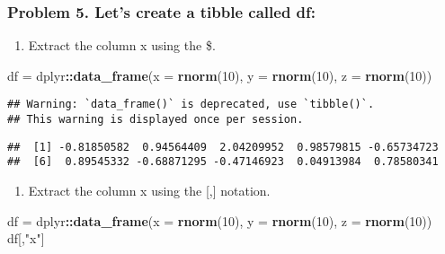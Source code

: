 \documentclass[]{article}
\newenvironment{Shaded}{\begin{snugshade}}{\end{snugshade}}
\newcommand{\DataTypeTok}[1]{\textcolor[rgb]{0.13,0.29,0.53}{#1}}
\newcommand{\DecValTok}[1]{\textcolor[rgb]{0.00,0.00,0.81}{#1}}
\newcommand{\KeywordTok}[1]{\textcolor[rgb]{0.13,0.29,0.53}{\textbf{#1}}}
\newcommand{\NormalTok}[1]{#1}
\newcommand{\OperatorTok}[1]{\textcolor[rgb]{0.81,0.36,0.00}{\textbf{#1}}}
\newcommand{\StringTok}[1]{\textcolor[rgb]{0.31,0.60,0.02}{#1}}
\providecommand{\tightlist}{%
  \setlength{\itemsep}{0pt}\setlength{\parskip}{0pt}}
\begin{document}
\hypertarget{problem-5.-lets-create-a-tibble-called-df}{%
\subsubsection{Problem 5. Let's create a tibble called
df:}\label{problem-5.-lets-create-a-tibble-called-df}}

\begin{enumerate}
\def\labelenumi{\alph{enumi}.}
\tightlist
\item
  Extract the column x using the \$.
\end{enumerate}

\begin{Shaded}
\begin{Highlighting}[]
\NormalTok{df =}\StringTok{ }\NormalTok{dplyr}\OperatorTok{::}\KeywordTok{data_frame}\NormalTok{(}\DataTypeTok{x =} \KeywordTok{rnorm}\NormalTok{(}\DecValTok{10}\NormalTok{), }\DataTypeTok{y =} \KeywordTok{rnorm}\NormalTok{(}\DecValTok{10}\NormalTok{), }\DataTypeTok{z =} \KeywordTok{rnorm}\NormalTok{(}\DecValTok{10}\NormalTok{)) }
\end{Highlighting}
\end{Shaded}

\begin{verbatim}
## Warning: `data_frame()` is deprecated, use `tibble()`.
## This warning is displayed once per session.
\end{verbatim}

\begin{Shaded}
\end{Shaded}

\begin{verbatim}
##  [1] -0.81850582  0.94564409  2.04209952  0.98579815 -0.65734723
##  [6]  0.89545332 -0.68871295 -0.47146923  0.04913984  0.78580341
\end{verbatim}

\begin{enumerate}
\def\labelenumi{\alph{enumi}.}
\setcounter{enumi}{1}
\tightlist
\item
  Extract the column x using the {[},{]} notation.
\end{enumerate}

\begin{Shaded}
\begin{Highlighting}[]
\NormalTok{df =}\StringTok{ }\NormalTok{dplyr}\OperatorTok{::}\KeywordTok{data_frame}\NormalTok{(}\DataTypeTok{x =} \KeywordTok{rnorm}\NormalTok{(}\DecValTok{10}\NormalTok{), }\DataTypeTok{y =} \KeywordTok{rnorm}\NormalTok{(}\DecValTok{10}\NormalTok{), }\DataTypeTok{z =} \KeywordTok{rnorm}\NormalTok{(}\DecValTok{10}\NormalTok{)) }
\NormalTok{df[,}\StringTok{"x"}\NormalTok{]}
\end{Highlighting}
\end{Shaded}
\end{document}

